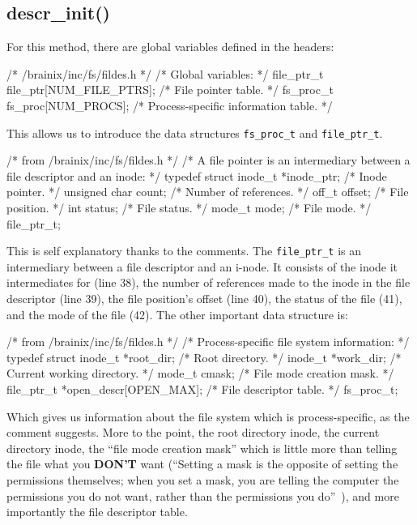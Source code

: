 \subsection{descr\_init()}

For this method, there are global variables defined in the headers:
\begin{code}[numbers=left,firstnumber=54]
/* /brainix/inc/fs/fildes.h */
 /* Global variables: */
 file_ptr_t file_ptr[NUM_FILE_PTRS]; /* File pointer table.                 */
 fs_proc_t fs_proc[NUM_PROCS];       /* Process-specific information table. */
\end{code}
This allows us to introduce the data structures \verb|fs_proc_t| and \verb|file_ptr_t|. 
\begin{code}[numbers=left,firstnumber=35]
/* from /brainix/inc/fs/fildes.h */
 /* A file pointer is an intermediary between a file descriptor and an inode: */
 typedef struct
 {
      inode_t *inode_ptr;  /* Inode pointer.        */
      unsigned char count; /* Number of references. */
      off_t offset;        /* File position.        */
      int status;          /* File status.          */
      mode_t mode;         /* File mode.            */
 } file_ptr_t;
\end{code}
This is self explanatory thanks to the comments. The \verb|file_ptr_t| is an intermediary between a file descriptor and an i-node. It consists of the inode it intermediates for (line 38), the number of references made to the inode in the file descriptor (line 39), the file position's offset (line 40), the status of the file (41), and the mode of the file (42). The other important data structure is:
\begin{code}[numbers=left,firstnumber=45]
/* from /brainix/inc/fs/fildes.h */
 /* Process-specific file system information: */
 typedef struct
 {
      inode_t *root_dir;                /* Root directory.            */
      inode_t *work_dir;                /* Current working directory. */
      mode_t cmask;                     /* File mode creation mask.   */
      file_ptr_t *open_descr[OPEN_MAX]; /* File descriptor table.     */
 } fs_proc_t;
\end{code}
Which gives us information about the file system which is process-specific, as the comment suggests. More to the point, the root directory inode, the current directory inode, the ``file mode creation mask'' which is little more than telling the file what you \textbf{DON'T} want (``Setting a mask is the opposite of setting the permissions themselves; when you set a mask, you are telling the computer the permissions you do not want, rather than the permissions you do''~\cite{9}), and more importantly the file descriptor table.

